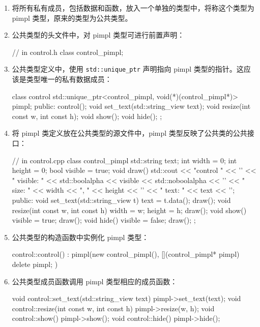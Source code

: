 \begin{enumerate}
\item
将所有私有成员，包括数据和函数，放入一个单独的类型中，将称这个类型为 pimpl 类型，原来的类型为公共类型。

\item
公共类型的头文件中，对 pimpl 类型可进行前置声明：

\begin{cpp}
// in control.h
class control_pimpl;
\end{cpp}

\item
公共类型定义中，使用 \verb|std::unique_ptr| 声明指向 pimpl 类型的指针。这应该是类型唯一的私有数据成员：

\begin{cpp}
class control
{
std::unique_ptr<control_pimpl, void(*)(control_pimpl*)> pimpl;
public:
    control();
    void set_text(std::string_view text);
    void resize(int const w, int const h);
    void show();
    void hide();
};
\end{cpp}

\item
将 pimpl 类定义放在公共类型的源文件中，pimpl 类型反映了公共类的公共接口：

\begin{cpp}
// in control.cpp
class control_pimpl
{
    std::string text;
    int width = 0;
    int height = 0;
    bool visible = true;
    void draw()
    {
        std::cout
            << "control " << '\n'
            << " visible: " << std::boolalpha << visible
            << std::noboolalpha << '\n'
            << " size: " << width << ", " << height << '\n'
            << " text: " << text << '\n';
    }
    public:
    void set_text(std::string_view t)
    {
        text = t.data();
        draw();
    }
    void resize(int const w, int const h)
    {
        width = w;
        height = h;
        draw();
    }
    void show()
    {
        visible = true;
        draw();
    }
    void hide()
    {
        visible = false;
        draw();
    }
};
\end{cpp}

\item
公共类型的构造函数中实例化 pimpl 类型：

\begin{cpp}
control::control() :
    pimpl(new control_pimpl(),
        [](control_pimpl* pimpl) {delete pimpl; })
{}
\end{cpp}

\item
公共类型成员函数调用 pimpl 类型相应的成员函数：

\begin{cpp}
void control::set_text(std::string_view text)
{
    pimpl->set_text(text);
}
void control::resize(int const w, int const h)
{
    pimpl->resize(w, h);
}
void control::show()
{
    pimpl->show();
}
void control::hide()
{
    pimpl->hide();
}
\end{cpp}
\end{enumerate}

